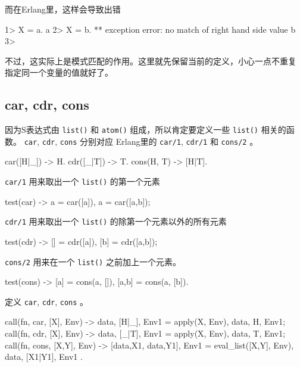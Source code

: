 \documentclass[preview,multi,crop=false,border=1in,class=memoir]{standalone}
\begin{document}
\begin{preview-page}
而在Erlang里，这样会导致出错

\begin{ErlangShellSession}
1> X = a.
a
2> X = b.
** exception error: no match of right hand side value b
3>
\end{ErlangShellSession}

不过，这实际上是模式匹配的作用。这里就先保留当前的定义，小心一点不重复
指定同一个变量的值就好了。

\subsection{car, cdr, cons}

因为S表达式由 \verb|list()| 和 \verb|atom()| 组成，所以肯定要定义一些
\verb|list()| 相关的函数。 \verb|car|, \verb|cdr|, \verb|cons| 分别对应
Erlang里的 \verb|car/1|, \verb|cdr/1| 和 \verb|cons/2| 。

\begin{SourceCode}
car([H|_]) -> H.
cdr([_|T]) -> T.
cons(H, T) -> [H|T].
\end{SourceCode}

\verb|car/1| 用来取出一个 \verb|list()| 的第一个元素

\begin{SourceCode}
test(car) ->
    a = car([a]),
    a = car([a,b]);
\end{SourceCode}

\verb|cdr/1| 用来取出一个 \verb|list()| 的除第一个元素以外的所有元素

\begin{SourceCode}
test(cdr) ->
    [] = cdr([a]),
    [b] = cdr([a,b]);
\end{SourceCode}

\verb|cons/2| 用来在一个 \verb|list()| 之前加上一个元素。

\begin{SourceCode}
test(cons) ->
    [a] = cons(a, []),
    [a,b] = cons(a, [b]).
\end{SourceCode}

定义 \verb|car|, \verb|cdr|, \verb|cons| 。

\begin{SourceCode}
call({fn, car}, [X], Env) ->
    {{data, [H|_]}, Env1} = apply(X, Env),
    {{data, H}, Env1};
call({fn, cdr}, [X], Env) ->
    {{data, [_|T]}, Env1} = apply(X, Env),
    {{data, T}, Env1};
call({fn, cons}, [X,Y], Env) ->
    {[{data,X1}, {data,Y1}], Env1} =
        eval_list([X,Y], Env),
    {{data, [X1|Y1]}, Env1}
.
\end{SourceCode}


\end{preview-page}
\end{document}
